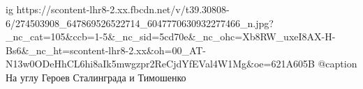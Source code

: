  
 
 
 
 

\ifcmt
  ig https://scontent-lhr8-2.xx.fbcdn.net/v/t39.30808-6/274503908_647869526522714_6047770630932277466_n.jpg?_nc_cat=105&ccb=1-5&_nc_sid=5cd70e&_nc_ohc=Xb8RW_uxeI8AX-H-Bs6&_nc_ht=scontent-lhr8-2.xx&oh=00_AT-N13w0ODeHhCL6hi8aIk5mwgzpr2ReCjdYfEVal4W1Mg&oe=621A605B
	@caption На углу Героев Сталинграда и Тимошенко
\fi
